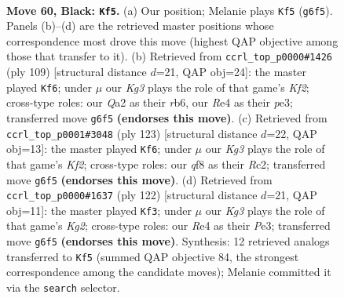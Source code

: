 \documentclass[11pt]{article}
\begin{document}
\clearpage

\begin{figure}[p]\centering
\begin{subfigure}{0.46\textwidth}\centering
\resizebox{\linewidth}{!}{%
\newchessgame
\chessboard[
  setfen={5Q2/8/5pk1/3p4/4r3/6PK/q6P/8 b - - 1 60},
  showmover=false,
  pgfstyle=straightmove, color=movearrow, markmove={g6-f5}
]}
\caption{}
\end{subfigure}\hfill
\begin{subfigure}{0.46\textwidth}\centering
\resizebox{\linewidth}{!}{%
\newchessgame
\chessboard[
  setfen={8/5k2/1R2p3/5p2/8/4P1K1/3r1PP1/8 b - - 27 55},
  showmover=false,
  pgfstyle=straightmove, color=movearrow, markmove={f7-f6}
]}
\caption{}
\end{subfigure}
\\[4pt]
\begin{subfigure}{0.46\textwidth}\centering
\resizebox{\linewidth}{!}{%
\newchessgame
\chessboard[
  setfen={1R6/5k2/6p1/4p3/8/4PK2/2r2P2/8 b - - 13 62},
  showmover=false,
  pgfstyle=straightmove, color=movearrow, markmove={f7-f6}
]}
\caption{}
\end{subfigure}\hfill
\begin{subfigure}{0.46\textwidth}\centering
\resizebox{\linewidth}{!}{%
\newchessgame
\chessboard[
  setfen={8/5Q2/3q2pk/3P3p/8/4P3/6K1/8 w - - 1 62},
  showmover=false,
  pgfstyle=straightmove, color=movearrow, markmove={g2-f3}
]}
\caption{}
\end{subfigure}
\caption{\textbf{Move 60, Black: \texttt{Kf5}.} (a) Our position; Melanie plays \texttt{Kf5} (\texttt{g6f5}). Panels (b)--(d) are the retrieved master positions whose correspondence most drove this move (highest QAP objective among those that transfer to it). (b) Retrieved from \texttt{ccrl\_top\_p0000\#1426} (ply 109) [structural distance $d$=21, QAP obj=24]: the master played \texttt{Kf6}; under $\mu$ our \emph{Kg3} plays the role of that game's \emph{Kf2}; cross-type roles: our \emph{Q}a2 as their \emph{r}b6, our \emph{R}e4 as their \emph{p}e3; transferred move \texttt{g6f5} \textbf{(endorses this move)}. (c) Retrieved from \texttt{ccrl\_top\_p0001\#3048} (ply 123) [structural distance $d$=22, QAP obj=13]: the master played \texttt{Kf6}; under $\mu$ our \emph{Kg3} plays the role of that game's \emph{Kf2}; cross-type roles: our \emph{q}f8 as their \emph{R}c2; transferred move \texttt{g6f5} \textbf{(endorses this move)}. (d) Retrieved from \texttt{ccrl\_top\_p0000\#1637} (ply 122) [structural distance $d$=21, QAP obj=11]: the master played \texttt{Kf3}; under $\mu$ our \emph{Kg3} plays the role of that game's \emph{Kg2}; cross-type roles: our \emph{R}e4 as their \emph{P}e3; transferred move \texttt{g6f5} \textbf{(endorses this move)}. Synthesis: 12 retrieved analogs transferred to \texttt{Kf5} (summed QAP objective 84, the strongest correspondence among the candidate moves); Melanie committed it via the \texttt{search} selector.}
\label{fig:thought-m119}
\end{figure}
\end{document}
